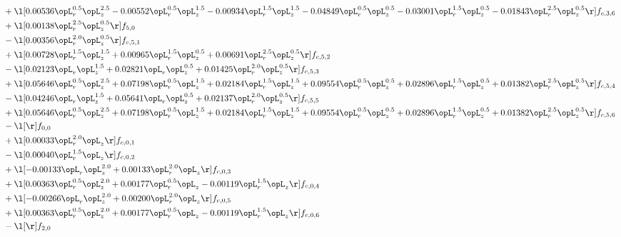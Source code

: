 \begin{alignat}{2}
& + \l[  0.00536 \opL_r^{0.5} \opL_z^{2.5}   -0.00552 \opL_r^{0.5} \opL_z^{1.5}   -0.00934 \opL_r^{1.5} \opL_z^{1.5}   -0.04849 \opL_r^{0.5} \opL_z^{0.5}   -0.03001 \opL_r^{1.5} \opL_z^{0.5}   -0.01843 \opL_r^{2.5} \opL_z^{0.5}  \r] f_{c,3,6} \nonumber \\ 
& + \l[  0.00138 \opL_r^{2.5} \opL_z^{0.5}  \r] f_{5,0} \nonumber \\ 
& - \l[  0.00356 \opL_r^{2.0} \opL_z^{0.5}  \r] f_{c,5,1} \nonumber \\ 
& + \l[  0.00728 \opL_r^{1.5} \opL_z^{1.5} +  0.00965 \opL_r^{1.5} \opL_z^{0.5} +  0.00691 \opL_r^{2.5} \opL_z^{0.5}  \r] f_{c,5,2} \nonumber \\ 
& - \l[  0.02123 \opL_r \opL_z^{1.5} +  0.02821 \opL_r \opL_z^{0.5} +  0.01425 \opL_r^{2.0} \opL_z^{0.5}  \r] f_{c,5,3} \nonumber \\ 
& + \l[  0.05646 \opL_r^{0.5} \opL_z^{2.5} +  0.07198 \opL_r^{0.5} \opL_z^{1.5} +  0.02184 \opL_r^{1.5} \opL_z^{1.5} +  0.09554 \opL_r^{0.5} \opL_z^{0.5} +  0.02896 \opL_r^{1.5} \opL_z^{0.5} +  0.01382 \opL_r^{2.5} \opL_z^{0.5}  \r] f_{c,5,4} \nonumber \\ 
& - \l[  0.04246 \opL_r \opL_z^{1.5} +  0.05641 \opL_r \opL_z^{0.5} +  0.02137 \opL_r^{2.0} \opL_z^{0.5}  \r] f_{c,5,5} \nonumber \\ 
& + \l[  0.05646 \opL_r^{0.5} \opL_z^{2.5} +  0.07198 \opL_r^{0.5} \opL_z^{1.5} +  0.02184 \opL_r^{1.5} \opL_z^{1.5} +  0.09554 \opL_r^{0.5} \opL_z^{0.5} +  0.02896 \opL_r^{1.5} \opL_z^{0.5} +  0.01382 \opL_r^{2.5} \opL_z^{0.5}  \r] f_{c,5,6} \nonumber \\ 
& - \l[  \r] f_{0,0} \nonumber \\ 
& + \l[  0.00033 \opL_r^{2.0} \opL_z  \r] f_{c,0,1} \nonumber \\ 
& - \l[  0.00040 \opL_r^{1.5} \opL_z  \r] f_{c,0,2} \nonumber \\ 
& + \l[  -0.00133 \opL_r \opL_z^{2.0} +  0.00133 \opL_r^{2.0} \opL_z  \r] f_{c,0,3} \nonumber \\ 
& + \l[  0.00363 \opL_r^{0.5} \opL_z^{2.0} +  0.00177 \opL_r^{0.5} \opL_z   -0.00119 \opL_r^{1.5} \opL_z  \r] f_{c,0,4} \nonumber \\ 
& + \l[  -0.00266 \opL_r \opL_z^{2.0} +  0.00200 \opL_r^{2.0} \opL_z  \r] f_{c,0,5} \nonumber \\ 
& + \l[  0.00363 \opL_r^{0.5} \opL_z^{2.0} +  0.00177 \opL_r^{0.5} \opL_z   -0.00119 \opL_r^{1.5} \opL_z  \r] f_{c,0,6} \nonumber \\ 
& - \l[  \r] f_{2,0} \nonumber \\ 

\end{alignat}
